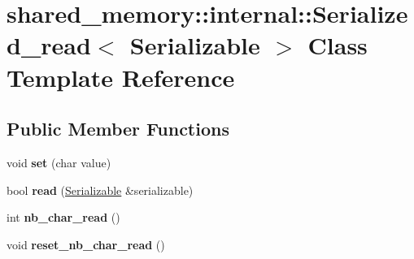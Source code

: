 \hypertarget{classshared__memory_1_1internal_1_1Serialized__read}{}\section{shared\+\_\+memory\+:\+:internal\+:\+:Serialized\+\_\+read$<$ Serializable $>$ Class Template Reference}
\label{classshared__memory_1_1internal_1_1Serialized__read}
\subsection*{Public Member Functions}
\begin{DoxyCompactItemize}
\item 
void {\bfseries set} (char value)\hypertarget{classshared__memory_1_1internal_1_1Serialized__read_ab13f4c5e450bc206ca5f30baa43ed5f6}{}\label{classshared__memory_1_1internal_1_1Serialized__read_ab13f4c5e450bc206ca5f30baa43ed5f6}

\item 
bool {\bfseries read} (\hyperlink{classSerializable}{Serializable} \&serializable)\hypertarget{classshared__memory_1_1internal_1_1Serialized__read_add7a39a632e0f6868e60109ad58fa3a2}{}\label{classshared__memory_1_1internal_1_1Serialized__read_add7a39a632e0f6868e60109ad58fa3a2}

\item 
int {\bfseries nb\+\_\+char\+\_\+read} ()\hypertarget{classshared__memory_1_1internal_1_1Serialized__read_a7267b8b68f925787f37fa9c0e369a93b}{}\label{classshared__memory_1_1internal_1_1Serialized__read_a7267b8b68f925787f37fa9c0e369a93b}

\item 
void {\bfseries reset\+\_\+nb\+\_\+char\+\_\+read} ()\hypertarget{classshared__memory_1_1internal_1_1Serialized__read_a664a3d89efb0f985578b3fb4835f97d4}{}\label{classshared__memory_1_1internal_1_1Serialized__read_a664a3d89efb0f985578b3fb4835f97d4}

\end{DoxyCompactItemize}
